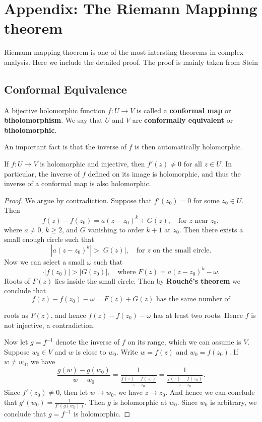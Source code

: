 \documentclass{article}
\begin{document}
\section{Appendix: The Riemann Mappinng theorem}
Riemann mapping thoerem is one of the most intersting theorems in complex analysis. Here we include the detailed proof. The proof is mainly taken from Stein

\subsection*{Conformal Equivalence}

\begin{definition}
A bijective holomorphic function $f: U \to V$ is called a \textbf{conformal map} or \textbf{biholomorphism}. We say that $U$ and $V$ are \textbf{conformally equivalent} or \textbf{biholomorphic}.
\end{definition}

An important fact is that the inverse of $f$ is then automatically holomorphic.

\begin{proposition}
If $f: U \to V$ is holomorphic and injective, then $f'(z) \ne 0$ for all $z \in U$. In particular, the inverse of $f$ defined on its image is holomorphic, and thus the inverse of a conformal map is also holomorphic.
\end{proposition}

\begin{proof}
We argue by contradiction. Suppose that $f'(z_0) = 0$ for some $z_0 \in U$. Then
$$f(z) - f(z_0) = a(z-z_0)^k + G(z), \quad \text{for } z \text{ near } z_0,$$
where $a \ne 0$, $k \ge 2$, and $G$ vanishing to order $k+1$ at $z_0$.
Then there exists a small enough circle such that
$$|a(z-z_0)^k| > |G(z)|, \quad \text{for } z \text{ on the small circle.}$$
Now we can select a small $\omega$ such that
$$\cdot |f(z_0) | > |G(z_0)|, \quad \text{where } F(z) = a(z-z_0)^k - \omega.$$
Roots of $F(z)$ lies inside the small circle.
Then by \textbf{Rouch\'e's theorem} we conclude that
$$f(z) - f(z_0) - \omega = F(z) + G(z) \text{ has the same number of}$$

roots as $F(z)$, and hence $f(z) - f(z_0) - \omega$ has at least two roots.
Hence $f$ is not injective, a contradiction.

Now let $g = f^{-1}$ denote the inverse of $f$ on its range, which we can assume is $V$. Suppose $w_0 \in V$ and $w$ is close to $w_0$. Write $w = f(z)$ and $w_0 = f(z_0)$. If $w \ne w_0$, we have
$$\frac{g(w) - g(w_0)}{w - w_0} = \frac{1}{\frac{f(z) - f(z_0)}{z - z_0}} = \frac{1}{\frac{f(z) - f(z_0)}{z - z_0}}.$$
Since $f'(z_0) \ne 0$, then let $w \to w_0$, we have $z \to z_0$.
And hence we can conclude that $g'(w_0) = \frac{1}{f'(g(w_0))}$.
Then $g$ is holomorphic at $w_0$. Since $w_0$ is arbitrary, we conclude that $g = f^{-1}$ is holomorphic.
\end{proof}
\end{document}
